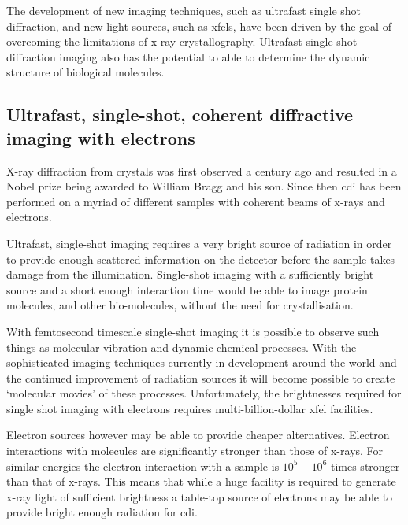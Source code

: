 The development of new imaging techniques, such as ultrafast single shot diffraction, and new light sources, such as \glspl{xfel}, have been driven by the goal of overcoming the limitations of x-ray crystallography. Ultrafast single-shot diffraction imaging also has the potential to able to determine the dynamic structure of biological molecules.



\subsection{Ultrafast, single-shot, coherent diffractive imaging with electrons}

X-ray diffraction from crystals was first observed a century ago\cite{bragg_x-rays_1912} and resulted in a Nobel prize being awarded to William Bragg and his son. Since then \gls{cdi} has been performed on a myriad of different samples with coherent beams of x-rays and electrons.

Ultrafast, single-shot imaging requires a very bright source of radiation in order to provide enough scattered information on the detector before the sample takes damage from the illumination\cite{henderson_potential_1995}. Single-shot imaging with a sufficiently bright source and a short enough interaction time would be able to image protein molecules, and other bio-molecules, without the need for crystallisation\cite{neutze_potential_2000}.

With femtosecond timescale single-shot imaging it is possible to observe such things as molecular vibration and dynamic chemical processes\cite{zewail_4d_2006}. With the sophisticated imaging techniques currently in development around the world and the continued improvement of radiation sources it will become possible to create `molecular movies'\cite{dwyer_femtosecond_2006} of these processes. Unfortunately, the brightnesses required for single shot imaging with electrons requires multi-billion-dollar \gls{xfel} facilities.

Electron sources however may be able to provide cheaper alternatives. Electron interactions with molecules are significantly stronger than those of x-rays. For similar energies the electron interaction with a sample is $10^5-10^6$ times stronger than that of x-rays\cite{sciaini_femtosecond_2011}. This means that while a huge facility is required to generate x-ray light of sufficient brightness a table-top source of electrons may be able to provide bright enough radiation for \gls{cdi}.

